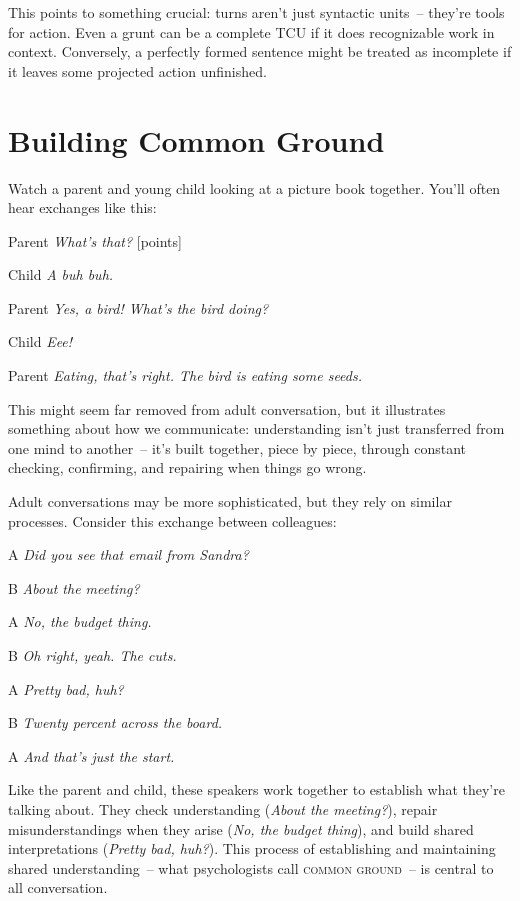 This points to something crucial: turns aren't just syntactic units~-- they're tools for action. Even a grunt can be a complete TCU if it does recognizable work in context. Conversely, a perfectly formed sentence might be treated as incomplete if it leaves some projected action unfinished.

\section{Building Common Ground} \label{sec:common-ground}

Watch a parent and young child looking at a picture book together. You'll often hear exchanges like this:

\ea
\begin{dialogue}
\item[Parent] \textit{What's that?} [points]
\item[Child] \textit{A buh buh.}
\item[Parent] \textit{Yes, a bird! What's the bird doing?}
\item[Child] \textit{Eee!}
\item[Parent] \textit{Eating, that's right. The bird is eating some seeds.}
\end{dialogue}
\z
This might seem far removed from adult conversation, but it illustrates something about how we communicate: understanding isn't just transferred from one mind to another~-- it's built together, piece by piece, through constant checking, confirming, and repairing when things go wrong.

Adult conversations may be more sophisticated, but they rely on similar processes. Consider this exchange between colleagues:

\ea
\begin{dialogue}
\item[A] \textit{Did you see that email from Sandra?}
\item[B] \textit{About the meeting?}
\item[A] \textit{No, the budget thing.}
\item[B] \textit{Oh right, yeah. The cuts.}
\item[A] \textit{Pretty bad, huh?}
\item[B] \textit{Twenty percent across the board.}
\item[A] \textit{And that's just the start.}
\end{dialogue}
\z
Like the parent and child, these speakers work together to establish what they're talking about. They check understanding (\textit{About the meeting?}), repair misunderstandings when they arise (\textit{No, the budget thing}), and build shared interpretations (\textit{Pretty bad, huh?}). This process of establishing and maintaining shared understanding~-- what psychologists call \textsc{common ground}~-- is central to all conversation.

